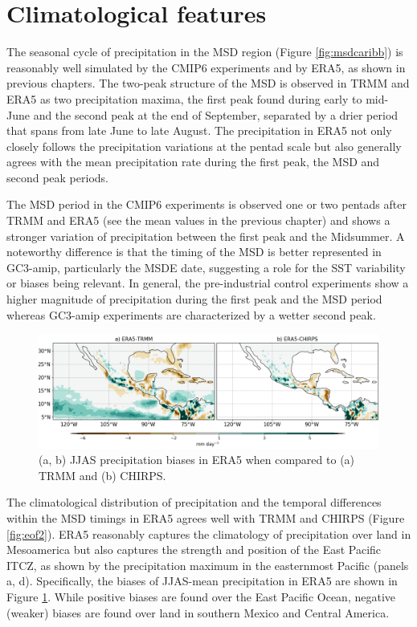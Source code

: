 \section{Climatological features}

\label{sq:msdclim}



The seasonal cycle of precipitation in the MSD region (Figure \ref{fig:msdcaribb}) is reasonably well simulated by the CMIP6 experiments and by ERA5, as shown in previous chapters.
The two-peak structure of the MSD is observed in TRMM and ERA5 as two precipitation maxima, the first peak found during early to mid-June and the second peak at the end of September, separated by a drier period that spans from late June to late August. The precipitation in ERA5 not only closely follows the precipitation variations at the pentad scale but also generally agrees with the mean precipitation rate during the first peak, the MSD and second peak periods.

The MSD period in the CMIP6 experiments is observed one or two pentads after TRMM and ERA5 (see the mean values in the previous chapter) and shows a stronger variation of precipitation between the first peak and the Midsummer. A noteworthy difference is that the timing of the MSD is better represented in GC3-amip, particularly the MSDE date, suggesting a role for the SST variability or biases being relevant.
In general, the pre-industrial control experiments show a higher magnitude of precipitation during the first peak and the MSD period whereas GC3-amip experiments are characterized by a wetter second peak. 

\begin{figure}[t!]
\includegraphics[width=\linewidth]{figures/fig_Era5}
\caption[ERA5 precipitation biases]{ (a, b) JJAS precipitation biases in ERA5 when compared to (a) TRMM and (b) CHIRPS. }
\label{fig:era5_bias_pr}
\end{figure}
 
 The climatological distribution of precipitation and the temporal differences within the MSD timings in ERA5 agrees well with TRMM and CHIRPS (Figure \ref{fig:eof2}). ERA5 reasonably captures the climatology of precipitation over land in Mesoamerica but also captures the strength and position of the East Pacific ITCZ, as shown by the precipitation maximum in the easternmost Pacific (panels a, d).  Specifically, the biases of JJAS-mean precipitation in ERA5 are shown in Figure \ref{fig:era5_bias_pr}. While positive biases are found over the East Pacific Ocean, negative (weaker) biases are found over land in southern Mexico and Central America.
 

